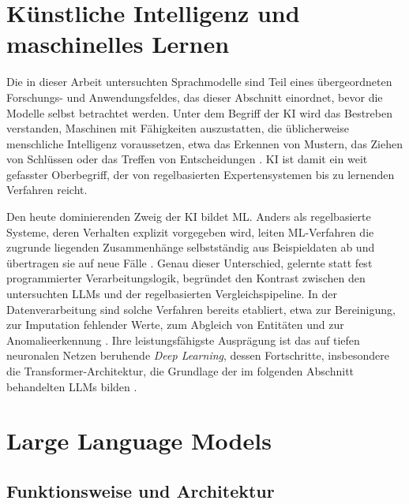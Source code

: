 \section{Künstliche Intelligenz und maschinelles Lernen}
\label{sec:ki-ml}

Die in dieser Arbeit untersuchten Sprachmodelle sind Teil eines übergeordneten Forschungs- und Anwendungsfeldes, das dieser Abschnitt einordnet, bevor die Modelle selbst betrachtet werden. Unter dem Begriff der \ac{KI} wird das Bestreben verstanden, Maschinen mit Fähigkeiten auszustatten, die üblicherweise menschliche Intelligenz voraussetzen, etwa das Erkennen von Mustern, das Ziehen von Schlüssen oder das Treffen von Entscheidungen \autocite{safitraAdvancementsArtificialIntelligence2024,bharadiyaRoleMachineLearning2023}. \ac{KI} ist damit ein weit gefasster Oberbegriff, der von regelbasierten Expertensystemen bis zu lernenden Verfahren reicht.

Den heute dominierenden Zweig der \ac{KI} bildet \ac{ML}. Anders als regelbasierte Systeme, deren Verhalten explizit vorgegeben wird, leiten \ac{ML}-Verfahren die zugrunde liegenden Zusammenhänge selbstständig aus Beispieldaten ab und übertragen sie auf neue Fälle \autocite{bharadiyaRoleMachineLearning2023,mumuniAutomatedDataProcessing2025}. Genau dieser Unterschied, gelernte statt fest programmierter Verarbeitungslogik, begründet den Kontrast zwischen den untersuchten \acp{LLM} und der regelbasierten Vergleichspipeline. In der Datenverarbeitung sind solche Verfahren bereits etabliert, etwa zur Bereinigung, zur Imputation fehlender Werte, zum Abgleich von Entitäten und zur Anomalieerkennung \autocite{coteDataCleaningMachine2024,mumuniAutomatedDataProcessing2025}. Ihre leistungsfähigste Ausprägung ist das auf tiefen neuronalen Netzen beruhende \emph{Deep Learning}, dessen Fortschritte, insbesondere die Transformer-Architektur, die Grundlage der im folgenden Abschnitt behandelten \acp{LLM} bilden \autocite{liangSurveyMultimodelLarge2024,zhaoSurveyLargeLanguage2026}.

\section{Large Language Models}
\label{sec:llm}

\subsection{Funktionsweise und Architektur}
\label{subsec:llm-architektur}

